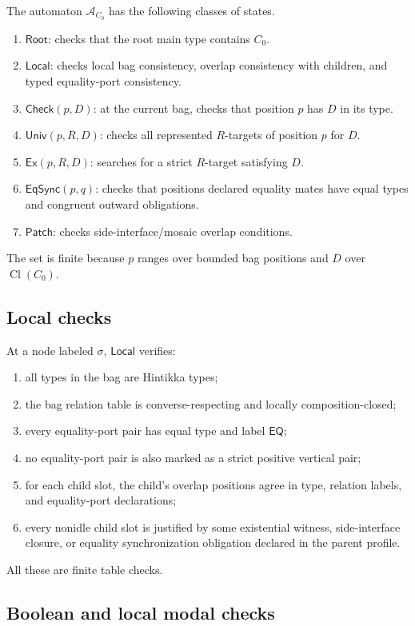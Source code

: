 \documentclass[11pt]{article}
\newcommand{\EQ}{\mathsf{EQ}}
\newcommand{\Cl}{\operatorname{Cl}}
\newcommand{\Aut}{\mathcal A}
\begin{document}
The automaton $\Aut_{C_0}$ has the following classes of states.
\begin{enumerate}[label=(Q\arabic*)]
\item $\mathsf{Root}$: checks that the root main type contains $C_0$.
\item $\mathsf{Local}$: checks local bag consistency, overlap consistency with children, and typed equality-port consistency.
\item $\mathsf{Check}(p,D)$: at the current bag, checks that position $p$ has $D$ in its type.
\item $\mathsf{Univ}(p,R,D)$: checks all represented $R$-targets of position $p$ for $D$.
\item $\mathsf{Ex}(p,R,D)$: searches for a strict $R$-target satisfying $D$.
\item $\mathsf{EqSync}(p,q)$: checks that positions declared equality mates have equal types and congruent outward obligations.
\item $\mathsf{Patch}$: checks side-interface/mosaic overlap conditions.
\end{enumerate}
The set is finite because $p$ ranges over bounded bag positions and $D$ over $\Cl(C_0)$.

\subsection{Local checks}

At a node labeled $\sigma$, $\mathsf{Local}$ verifies:
\begin{enumerate}[label=(L\arabic*)]
\item all types in the bag are Hintikka types;
\item the bag relation table is converse-respecting and locally composition-closed;
\item every equality-port pair has equal type and label $\EQ$;
\item no equality-port pair is also marked as a strict positive vertical pair;
\item for each child slot, the child's overlap positions agree in type, relation labels, and equality-port declarations;
\item every nonidle child slot is justified by some existential witness, side-interface closure, or equality synchronization obligation declared in the parent profile.
\end{enumerate}
All these are finite table checks.

\subsection{Boolean and local modal checks}
\end{document}
